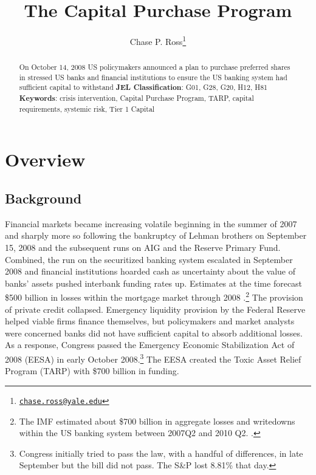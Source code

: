 \documentclass[12pt]{article}
\begin{document}
	\lhead{}
	\rhead{}
	\renewcommand{\headrulewidth}{0.0pt}
	\renewcommand{\footrulewidth}{0.0pt}

\title{The Capital Purchase Program}
\author{Chase P. Ross\thanks{\texttt{\href{mailto:chase.ross@yale.edu}{chase.ross@yale.edu}}}}
\date{}


\maketitle

\begin{abstract}
On October 14, 2008 US policymakers announced a plan to purchase preferred shares in stressed US banks and financial institutions to ensure the US banking system had sufficient capital to withstand
\newline
\newline
\textbf{JEL Classification}: G01, G28, G20, H12, H81
\newline
\textbf{Keywords}: crisis intervention, Capital Purchase Program, TARP,  capital requirements, systemic risk, Tier 1 Capital

\end{abstract}
\newpage
\tableofcontents
\newpage

\section{Overview}

\subsection{Background}

Financial markets became increasing volatile beginning in the summer of 2007 and sharply more so following the bankruptcy of Lehman brothers on September 15, 2008 and the subsequent runs on AIG and the Reserve Primary Fund. Combined, the run on the securitized banking system escalated in September 2008 and financial institutions hoarded cash as uncertainty about the value of banks' assets pushed interbank funding rates up. Estimates at the time forecast \$500 billion in losses within the mortgage market through 2008 \citep{Greenlaw}.\footnote{The IMF estimated about \$700 billion in aggregate losses and writedowns within the US banking system between 2007Q2 and 2010 Q2. \citep{IMF2010}.} The provision of private credit collapsed. Emergency liquidity provision by the Federal Reserve helped viable firms finance themselves, but policymakers and market analysts were concerned banks did not have sufficient capital to absorb additional  losses. As a response, Congress passed the Emergency Economic Stabilization Act of 2008 (EESA) in early October 2008.\footnote{Congress initially tried to pass the law, with a handful of differences, in late September but the bill did not pass. The S\&P lost 8.81\% that day.} The EESA created the Toxic Asset Relief Program (TARP) with \$700 billion in funding.
\end{document}
